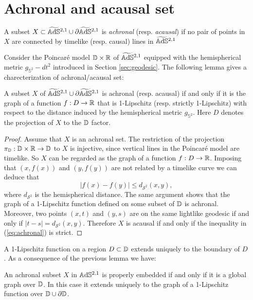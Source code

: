 \section{Achronal and acausal set}
\begin{definition}
    A subset $X \subset \widetilde{\mathbb{A}\mathrm{d}\mathbb{S}}{}^{2,1} \cup \partial\widetilde{\mathbb{A}\mathrm{d}\mathbb{S}}{}^{2,1}$ is \textit{achronal} (resp. \textit{acausal}) if no pair of points in $X$ are connected by timelike (resp. causal) lines in $\widetilde{\mathbb{A}\mathrm{d}\mathbb{S}}{}^{2,1}$
\end{definition}
Consider the Poincaré model $\mathbb{D}\times\mathbb{R}$ of $\widetilde{\mathbb{A}\mathrm{d}\mathbb{S}}{}^{2,1}$ equipped with the hemispherical metric $g_{\mathbb{S}^2} - dt^2$ introduced in Section \ref{sec:geodesic}. The following lemma gives a charecterization of achronal/acausal set:
\begin{lemma}\label{lem:1-lip}
    A subset $X$ of $\widetilde{\mathbb{A}\mathrm{d}\mathbb{S}}{}^{2,1} \cup \partial\widetilde{\mathbb{A}\mathrm{d}\mathbb{S}}{}^{2,1}$ is achronal (resp. acausal) if and only if it is the graph of a function $f : D \to \mathbb{R}$ that is 1-Lipschitz (resp. strictly 1-Lipschitz) with respect to the distance induced by the hemispherical metric $g_{\mathbb{S}^2}$. Here $D$ denotes the projection of $X$ to the $\mathbb{D}$ factor.
\end{lemma} 
\begin{proof}
    Assume that $X$ is an achronal set. The restriction of the projection $\pi_{\mathbb{D}} : \mathbb{D} \times \mathbb{R} \to \mathbb{D}$ to $X$ is injective, since vertical lines in the Poincaré model are timelike. So $X$ can be regarded as the graph of a function $f : D \to\mathbb{R}$. Imposing that $(x,f(x))$ and $(y,f(y))$ are not related by a timelike curve we can deduce that
    \begin{equation} \label{eq:achronal}
        |f(x) - f(y)| \leq d_{\mathcal{S}^2}(x,y),
    \end{equation}
    where $d_{\mathcal{S}^2}$ is the hemispherical distance. The same argument shows that the graph of a 1-Lipschitz function defined on some subset of $\mathbb{D}$ is achronal.\\
    Moreover, two points $(x,t)$ and $(y,s)$ are on the same lightlike geodesic if and only if $|t-s| =  d_{\mathcal{S}^2}(x,y)$. Therefore $X$ is acausal if and only if the inequality in (\ref{eq:achronal}) is strict.
\end{proof}
A 1-Lipschitz function on a region $D \subset \mathbb{D}$ extends uniquely to the boundary of $D$. As a consequence of the previous lemma we have:
\begin{lemma}\label{lem:global 1-lip}
    An achronal subset $X$ in $\mathbb{A}\mathrm{d}\mathbb{S}^{2,1}$ is properly embedded if and only if it is a global graph over $\mathbb{D}$. In this case it extends uniquely to the graph of a 1-Lipschitz function over $\mathbb{D} \cup \partial \mathbb{D}$.
\end{lemma}
